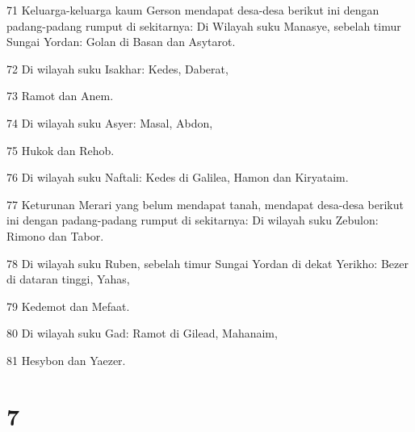 \par 71 Keluarga-keluarga kaum Gerson mendapat desa-desa berikut ini dengan padang-padang rumput di sekitarnya: Di Wilayah suku Manasye, sebelah timur Sungai Yordan: Golan di Basan dan Asytarot.
\par 72 Di wilayah suku Isakhar: Kedes, Daberat,
\par 73 Ramot dan Anem.
\par 74 Di wilayah suku Asyer: Masal, Abdon,
\par 75 Hukok dan Rehob.
\par 76 Di wilayah suku Naftali: Kedes di Galilea, Hamon dan Kiryataim.
\par 77 Keturunan Merari yang belum mendapat tanah, mendapat desa-desa berikut ini dengan padang-padang rumput di sekitarnya: Di wilayah suku Zebulon: Rimono dan Tabor.
\par 78 Di wilayah suku Ruben, sebelah timur Sungai Yordan di dekat Yerikho: Bezer di dataran tinggi, Yahas,
\par 79 Kedemot dan Mefaat.
\par 80 Di wilayah suku Gad: Ramot di Gilead, Mahanaim,
\par 81 Hesybon dan Yaezer.

\chapter{7}

